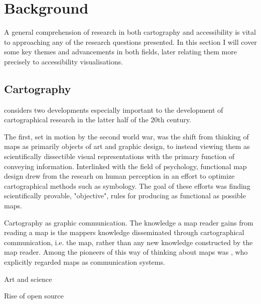 \documentclass[12pt]{article}
\begin{document}
\section{Background}
A general comprehension of research in both cartography and accessibility is
vital to approaching any of the research questions presented.
In this section I will cover some key themes and advancements in both fields,
later relating them more precisely to accessibility visualisations.


\subsection{Cartography}

\textcite{mac2004} considers two developments especially important
to the development of cartographical research in the latter half of the 20th century.

The first, set in motion by the second world war, was
the shift from thinking of maps as primarily objects of art and graphic design,
to instead viewing them as scientifically dissectible visual representations
with the primary function of conveying information.
Interlinked with the field of psychology,
functional map design drew from the researh on human perception
in an effort to optimize cartographical methods such as symbology.
The goal of these efforts was finding scientifically provable, "objective", rules
for producing as functional as possible maps.

Cartography as graphic communication.
The knowledge a map reader gains from reading a map is
the mappers knowledge disseminated through cartographical communication, i.e. the map,
rather than any new knowledge constructed by the map reader.
Among the pioneers of this way of thinking about maps was \textcite{kol1969},
who explicitly regarded maps as communication systems.

Art and science \parencite{mac2004, tyn1992}  %


Rise of open source \textcite{pet2015}
\end{document}
